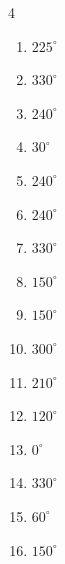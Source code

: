\begin{multicols}{4}
\begin{enumerate}
  \item $\displaystyle 225^{\circ}$

  \item $\displaystyle 330^{\circ}$

  \item $\displaystyle 240^{\circ}$

  \item $\displaystyle 30^{\circ}$

  \item $\displaystyle 240^{\circ}$

  \item $\displaystyle 240^{\circ}$

  \item $\displaystyle 330^{\circ}$

  \item $\displaystyle 150^{\circ}$

\columnbreak %

  \item $\displaystyle 150^{\circ}$

  \item $\displaystyle 300^{\circ}$

  \item $\displaystyle 210^{\circ}$

  \item $\displaystyle 120^{\circ}$

  \item $\displaystyle 0^{\circ}$
        \phantom{$\displaystyle =0$}

  \item $\displaystyle 330^{\circ}$

  \item $\displaystyle 60^{\circ}$

  \item $\displaystyle 150^{\circ}$


\end{enumerate}
\end{multicols}
